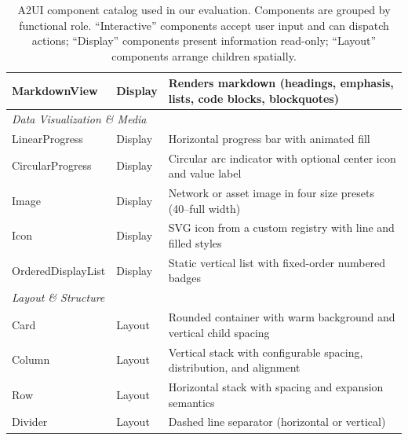 \documentclass{llmxive}
\begin{document}
\begin{table}[!htbp]
\begin{tabular}{llp{7.2cm}}
MarkdownView & Display & Renders markdown (headings, emphasis, lists, code blocks, blockquotes) \\
\midrule
\multicolumn{3}{l}{\textit{Data Visualization \& Media}} \\
LinearProgress & Display & Horizontal progress bar with animated fill \\
CircularProgress & Display & Circular arc indicator with optional center icon and value label \\
Image & Display & Network or asset image in four size presets (40--full width) \\
Icon & Display & SVG icon from a custom registry with line and filled styles \\
OrderedDisplayList & Display & Static vertical list with fixed-order numbered badges \\
\midrule
\multicolumn{3}{l}{\textit{Layout \& Structure}} \\
Card & Layout & Rounded container with warm background and vertical child spacing \\
Column & Layout & Vertical stack with configurable spacing, distribution, and alignment \\
Row & Layout & Horizontal stack with spacing and expansion semantics \\
Divider & Layout & Dashed line separator (horizontal or vertical) \\
\bottomrule
\end{tabular}

\caption{A2UI component catalog used in our evaluation. Components are grouped by functional role. ``Interactive'' components accept user input and can dispatch actions; ``Display'' components present information read-only; ``Layout'' components arrange children spatially.}
\label{tab:component-catalog}
\end{table}
\end{document}
